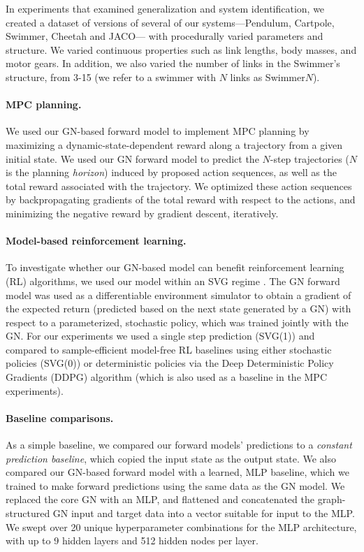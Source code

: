 \documentclass{article}
\begin{document}
In experiments that examined generalization and system identification, we created a dataset of versions of several of our systems---Pendulum, Cartpole, Swimmer, Cheetah and JACO--- with procedurally varied parameters and structure. We varied continuous properties such as link lengths, body masses, and motor gears. In addition, we also varied the number of links in the Swimmer's structure, from 3-15 (we refer to a swimmer with $N$ links as Swimmer$N$).

\paragraph{MPC planning.}
We used our GN-based forward model to implement MPC planning by maximizing a dynamic-state-dependent reward along a trajectory from a given initial state. We used our GN forward model to predict the $N$-step trajectories ($N$ is the planning \emph{horizon}) induced by proposed action sequences, as well as the total reward associated with the trajectory. We optimized these action sequences by backpropagating gradients of the total reward with respect to the actions, and minimizing the negative reward by gradient descent, iteratively.




\paragraph{Model-based reinforcement learning.}
To investigate whether our GN-based model can benefit reinforcement learning (RL) algorithms, we used our model within an SVG regime \citep{heess2015learning}. The GN forward model was used as a differentiable environment simulator to obtain a gradient of the expected return (predicted based on the next state generated by a GN) with respect to a parameterized, stochastic policy, which was trained jointly with the GN. For our experiments we used a single step prediction (SVG(1)) and compared to sample-efficient model-free RL baselines using either stochastic policies (SVG(0)) or deterministic policies via the Deep Deterministic Policy Gradients (DDPG) algorithm \citep{Lillicrap16} (which is also used as a baseline in the MPC experiments).

\paragraph{Baseline comparisons.}
As a simple baseline, we compared our forward models' predictions to a \emph{constant prediction baseline}, which copied the input state as the output state. 
%
We also compared our GN-based forward model with a learned, MLP baseline, which we trained to make forward predictions using the same data as the GN model. We replaced the core GN with an MLP, and flattened and concatenated the graph-structured GN input and target data into a vector suitable for input to the MLP. We swept over 20 unique hyperparameter combinations for the MLP architecture, with up to 9 hidden layers and 512 hidden nodes per layer.
\end{document}
